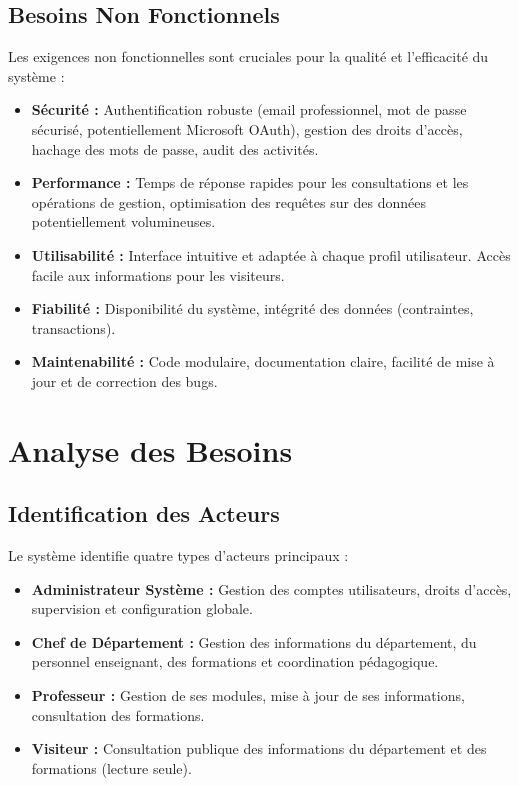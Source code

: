\subsection{Besoins Non Fonctionnels}
Les exigences non fonctionnelles sont cruciales pour la qualité et l'efficacité du système :
\begin{itemize}
    \item \textbf{Sécurité :} Authentification robuste (email professionnel, mot de passe sécurisé, potentiellement Microsoft OAuth), gestion des droits d'accès, hachage des mots de passe, audit des activités.
    \item \textbf{Performance :} Temps de réponse rapides pour les consultations et les opérations de gestion, optimisation des requêtes sur des données potentiellement volumineuses.
    \item \textbf{Utilisabilité :} Interface intuitive et adaptée à chaque profil utilisateur. Accès facile aux informations pour les visiteurs.
    \item \textbf{Fiabilité :} Disponibilité du système, intégrité des données (contraintes, transactions).
    \item \textbf{Maintenabilité :} Code modulaire, documentation claire, facilité de mise à jour et de correction des bugs.
\end{itemize}



\section{Analyse des Besoins}
\subsection{Identification des Acteurs}
Le système identifie quatre types d'acteurs principaux :
\begin{itemize}
    \item \textbf{Administrateur Système :} Gestion des comptes utilisateurs, droits d'accès, supervision et configuration globale.
    \item \textbf{Chef de Département :} Gestion des informations du département, du personnel enseignant, des formations et coordination pédagogique.
    \item \textbf{Professeur :} Gestion de ses modules, mise à jour de ses informations, consultation des formations.
    \item \textbf{Visiteur :} Consultation publique des informations du département et des formations (lecture seule).
\end{itemize}

